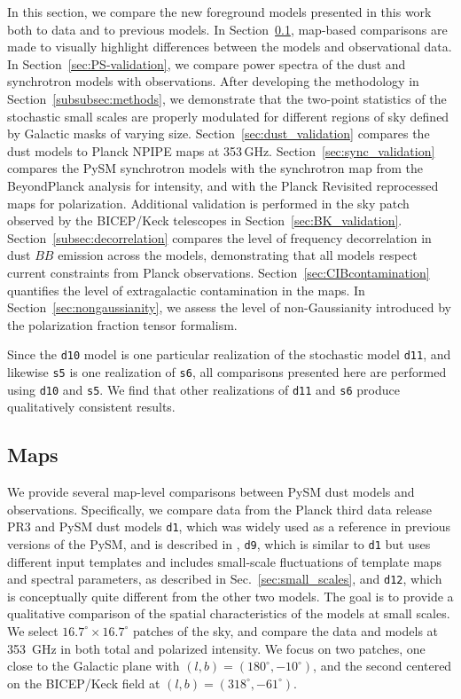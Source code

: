 \documentclass[twocolumn]{aastex631}
\begin{document}
In this section, we compare the new foreground models presented in this work both to data and to previous models. In Section~\ref{subsec:maps}, map-based comparisons are made to visually highlight differences between the models and observational data. In Section~\ref{sec:PS-validation}, we compare power spectra of the dust and synchrotron models with observations. After developing the methodology in Section~\ref{subsubsec:methods}, we demonstrate that the two-point statistics of the stochastic small scales are properly modulated for different regions of sky defined by Galactic masks of varying size. Section~\ref{sec:dust_validation} compares the dust models to Planck NPIPE maps at 353\,GHz. Section~\ref{sec:sync_validation} compares the PySM synchrotron models with the synchrotron map from the BeyondPlanck analysis for intensity, and with the Planck Revisited reprocessed maps for polarization. Additional validation is performed in the sky patch observed by the BICEP/Keck telescopes in Section~\ref{sec:BK_validation}. Section~\ref{subsec:decorrelation} compares the level of frequency decorrelation in dust $BB$ emission across the models, demonstrating that all models respect current constraints from Planck observations. Section~\ref{sec:CIBcontamination} quantifies the level of extragalactic contamination in the maps. In Section~\ref{sec:nongaussianity}, we assess the level of non-Gaussianity introduced by the polarization fraction tensor formalism.

Since the \texttt{d10} model is one particular realization of the stochastic model \texttt{d11}, and likewise \texttt{s5} is one realization of \texttt{s6}, all comparisons presented here are performed using \texttt{d10} and \texttt{s5}. We find that other realizations of \texttt{d11} and \texttt{s6} produce qualitatively consistent results.

\subsection{Maps}\label{subsec:maps}

We provide several map-level comparisons between PySM dust models and observations. Specifically, we compare data from the Planck third data release PR3 \cite{planck2016-l03} and PySM dust models \texttt{d1}, which was widely used as a reference in previous versions of the PySM, and is described in \cite{Thorne:2017}, {\tt d9}, which is similar to \texttt{d1} but uses different input templates and includes small-scale fluctuations of template maps and spectral parameters, as described in Sec.~\ref{sec:small_scales}, and {\tt d12}, which is conceptually quite different from the other two models. The goal is to provide a qualitative comparison of the spatial characteristics of the models at small scales. We select $16.7^\circ \times 16.7^\circ$ patches of the sky, and compare the data and models at 353~GHz in both total and polarized intensity. We focus on two patches, one close to the Galactic plane with $(l,b) =(180^\circ,-10^\circ)$, and the second centered on the BICEP/Keck field at $(l,b) =(318^\circ,-61^\circ)$. 
\end{document}
